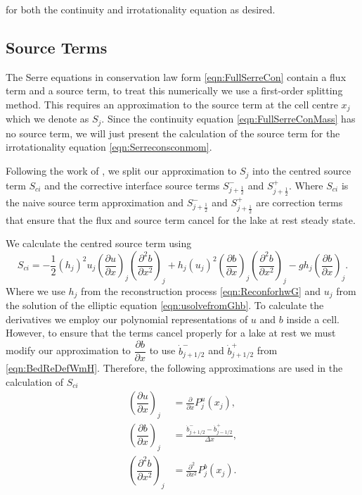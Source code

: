 for both the continuity and irrotationality equation as desired.

\subsection{Source Terms}
The Serre equations in conservation law form \eqref{eqn:FullSerreCon} contain a flux term and a source term, to treat this numerically we use a first-order splitting method. This requires an approximation to the source term at the cell centre $x_j$ which we denote as $S_j$. Since the continuity equation \eqref{eqn:FullSerreConMass} has no source term, we will just present the calculation of the source term for the irrotationality equation \eqref{eqn:Serreconsconmom}.

Following the work of \citet{Klein-etal-2004-2050}, we split our approximation to $S_j$ into the centred source term $S_{ci}$ and the corrective interface source terms $S^{-}_{j + \frac{1}{2}}$ and $S^{+}_{j + \frac{1}{2}}$.
Where $S_{ci}$ is the naive source term approximation and $S^{-}_{j + \frac{1}{2}}$ and $S^{+}_{j + \frac{1}{2}}$ are correction terms that ensure that the flux and source term cancel for the lake at rest steady state. 

We calculate the centred source term using
\begin{equation*}
 S_{ci} = -\frac{1}{2}\left(h_j\right)^2 {u_j}\left( \frac{\partial {u}}{\partial x} \right)_j \left(\frac{\partial^2 b}{\partial x^2} \right)_j  + h_j \left(u_j\right)^2 \left(\frac{\partial b}{\partial x}\right)_j \left(\frac{\partial^2 b}{\partial x^2}\right)_j - gh_j\left(\frac{\partial b}{\partial x}\right)_j.
\end{equation*}
Where we use $h_j$ from the reconstruction process \eqref{eqn:ReconforhwG} and $u_j$ from the solution of the elliptic equation \eqref{eqn:usolvefromGhb}. To calculate the derivatives we employ our polynomial representations of $u$ and $b$ inside a cell. However, to ensure that the terms cancel properly for a lake at rest we must modify our approximation to $\dfrac{\partial b}{\partial x}$ to use $\dot{b}^-_{j+1/2}$ and $\dot{b}^+_{j+1/2}$ from \eqref{eqn:BedReDefWmH}. Therefore, the following approximations are used in the calculation of $S_{ci}$
\begin{subequations}
	\begin{align}
	\left(\dfrac{\partial {u}}{\partial x} \right)_{j} &= \frac{\partial }{\partial x}P^u_j(x_{j}),  \\
\left(\dfrac{\partial {b}}{\partial x} \right)_{j} &=  \frac{\dot{b}^-_{j+1/2} - \dot{b}^+_{j-1/2}}{\Delta x} , \\	
	\left(\dfrac{\partial^2 {b}}{\partial x^2} \right)_{j} &= \frac{\partial^2 }{\partial x^2}P^b_j(x_{j}).
	\end{align}
	\label{eqn:dbduReconSource}
\end{subequations}

